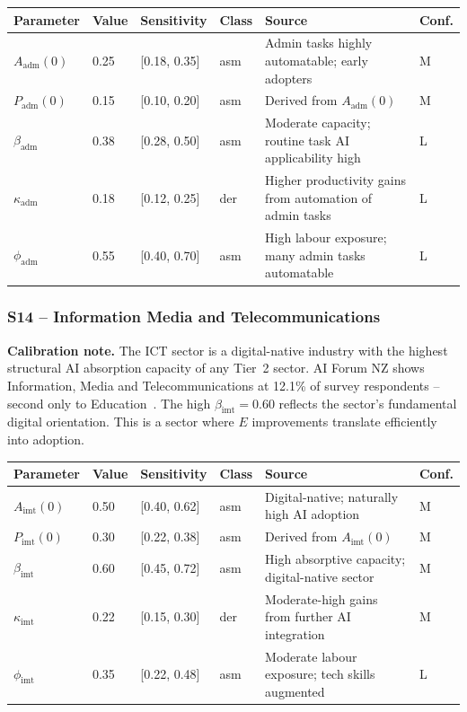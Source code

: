 \documentclass[11pt,a4paper]{article}
\begin{document}
\begin{center}
\begin{tabular}{llllll}
\toprule
Parameter & Value & Sensitivity & Class & Source & Conf.\\
\midrule
$A_{\text{adm}}(0)$ & 0.25 & [0.18, 0.35] & asm & Admin tasks highly automatable; early adopters & M \\
$P_{\text{adm}}(0)$ & 0.15 & [0.10, 0.20] & asm & Derived from $A_{\text{adm}}(0)$ & M \\
$\beta_{\text{adm}}$ & 0.38 & [0.28, 0.50] & asm & Moderate capacity; routine task AI applicability high & L \\
$\kappa_{\text{adm}}$ & 0.18 & [0.12, 0.25] & der & Higher productivity gains from automation of admin tasks & L \\
$\phi_{\text{adm}}$ & 0.55 & [0.40, 0.70] & asm & High labour exposure; many admin tasks automatable & L \\
\bottomrule
\end{tabular}
\end{center}

\subsubsection*{S14 -- Information Media and Telecommunications}

\textbf{Calibration note.} The ICT sector is a digital-native industry with the highest structural AI absorption capacity of any Tier~2 sector. AI Forum NZ shows Information, Media and Telecommunications at 12.1\% of survey respondents -- second only to Education~\cite{aiforum2024}. The high $\beta_{\text{imt}} = 0.60$ reflects the sector's fundamental digital orientation. This is a sector where $E$ improvements translate efficiently into adoption.

\begin{center}
\begin{tabular}{llllll}
\toprule
Parameter & Value & Sensitivity & Class & Source & Conf.\\
\midrule
$A_{\text{imt}}(0)$ & 0.50 & [0.40, 0.62] & asm & Digital-native; naturally high AI adoption & M \\
$P_{\text{imt}}(0)$ & 0.30 & [0.22, 0.38] & asm & Derived from $A_{\text{imt}}(0)$ & M \\
$\beta_{\text{imt}}$ & 0.60 & [0.45, 0.72] & asm & High absorptive capacity; digital-native sector & M \\
$\kappa_{\text{imt}}$ & 0.22 & [0.15, 0.30] & der & Moderate-high gains from further AI integration & M \\
$\phi_{\text{imt}}$ & 0.35 & [0.22, 0.48] & asm & Moderate labour exposure; tech skills augmented & L \\
\bottomrule
\end{tabular}
\end{center}
\end{document}
